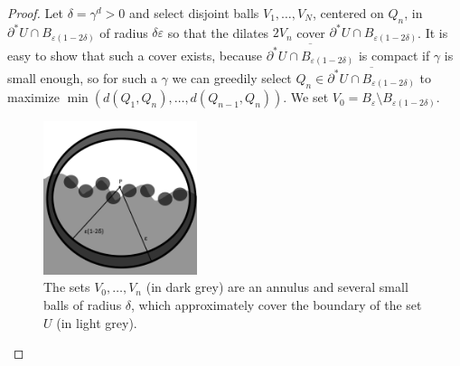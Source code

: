 \begin{proof}
Let $\delta = \gamma^d > 0$ and select disjoint balls $V_1, \dots, V_N$, centered on $Q_n$, in $\partial^* U \cap B_{\varepsilon(1 - 2\delta)}$ of radius $\delta\varepsilon$ so that the dilates $2V_n$ cover $\partial^* U \cap B_{\varepsilon(1 - 2\delta)}$.
It is easy to show that such a cover exists, because $\overline{\partial^* U \cap B_{\varepsilon(1 - 2\delta)}}$ is compact if $\gamma$ is small enough, so for such a $\gamma$ we can greedily select $Q_n \in \overline{\partial^* U \cap B_{\varepsilon(1 - 2\delta)}}$ to maximize $\min(d(Q_1, Q_n), \dots, d(Q_{n - 1}, Q_n))$.
We set $V_0 = B_\varepsilon \setminus B_{\varepsilon(1 - 2\delta)}$.

\begin{figure}[ht]
\caption{The sets $V_0, \dots, V_n$ (in dark grey) are an annulus and several small balls of radius $\delta$, which approximately cover the boundary of the set $U$ (in light grey).}
\includegraphics[width=0.4\textwidth]{covering lemma}
\end{figure}


\end{proof}
